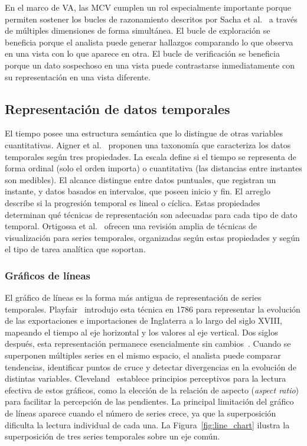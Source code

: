 En el marco de \ac{VA}, las \acs{MCV} cumplen un rol 
especialmente importante porque permiten sostener los 
bucles de razonamiento descritos por 
Sacha et al.~\cite{sacha2014} a través de múltiples 
dimensiones de forma simultánea. El bucle de 
exploración se beneficia porque el analista puede 
generar hallazgos comparando lo que observa en una 
vista con lo que aparece en otra. El bucle de 
verificación se beneficia porque un dato sospechoso 
en una vista puede contrastarse inmediatamente con 
su representación en una vista diferente.

\subsection{Representación de datos temporales}
\label{sec:temporal}

El tiempo posee una estructura semántica que lo 
distingue de otras variables cuantitativas. 
Aigner et al.~\cite{aigner2011visualization} proponen 
una taxonomía que caracteriza los datos temporales 
según tres propiedades. La escala define si el tiempo 
se representa de forma ordinal (solo el orden importa) 
o cuantitativa (las distancias entre instantes son 
medibles). El alcance distingue entre datos puntuales, 
que registran un instante, y datos basados en 
intervalos, que poseen inicio y fin. El arreglo 
describe si la progresión temporal es lineal o cíclica. 
Estas propiedades determinan qué técnicas de 
representación son adecuadas para cada tipo de dato 
temporal. Ortigossa et al.~\cite{ortigossa2025time} 
ofrecen una revisión amplia de técnicas de 
visualización para series temporales, organizadas 
según estas propiedades y según el tipo de tarea 
analítica que soportan.

\subsubsection{Gráficos de líneas}
\label{sec:linechart}

El gráfico de líneas es la forma más antigua de 
representación de series temporales. 
Playfair~\cite{playfair1786atlas} introdujo esta 
técnica en 1786 para representar la evolución de las 
exportaciones e importaciones de Inglaterra a lo largo 
del siglo XVIII, mapeando el tiempo al eje horizontal 
y los valores al eje vertical. Dos siglos después, 
esta representación permanece esencialmente sin 
cambios~\cite{tufte2001visual}. Cuando se superponen 
múltiples series en el mismo espacio, el analista puede 
comparar tendencias, identificar puntos de cruce y 
detectar divergencias en la evolución de distintas 
variables. Cleveland~\cite{cleveland1993visualizing} 
establece principios perceptivos para la lectura 
efectiva de estos gráficos, como la elección de la 
relación de aspecto (\textit{aspect ratio}) para 
facilitar la percepción de las pendientes. La principal 
limitación del gráfico de líneas aparece cuando el 
número de series crece, ya que la superposición 
dificulta la lectura individual de cada una. La 
Figura~\ref{fig:line_chart} ilustra la superposición 
de tres series temporales sobre un eje común.

